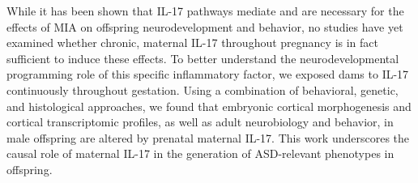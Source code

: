 \documentclass[]{article}
\begin{document}
While it has been shown that IL-17 pathways mediate and are necessary
for the effects of MIA on offspring neurodevelopment and behavior, no
studies have yet examined whether chronic, maternal IL-17 throughout
pregnancy is in fact sufficient to induce these effects. To better
understand the neurodevelopmental programming role of this specific
inflammatory factor, we exposed dams to IL-17 continuously throughout
gestation. Using a combination of behavioral, genetic, and histological
approaches, we found that embryonic cortical morphogenesis and cortical
transcriptomic profiles, as well as adult neurobiology and behavior, in
male offspring are altered by prenatal maternal IL-17. This work
underscores the causal role of maternal IL-17 in the generation of
ASD-relevant phenotypes in offspring.
\end{document}
